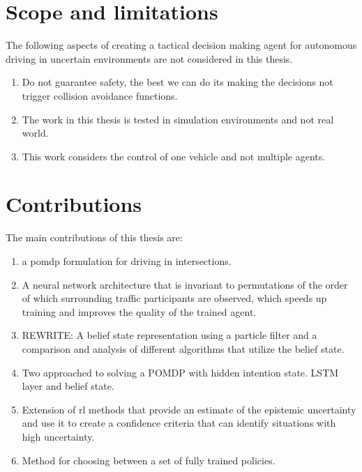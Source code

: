 \section{Scope and limitations}
\label{sec:scope}
The following aspects of creating a tactical decision making agent for autonomous driving in uncertain environments are not considered in this thesis. 

\begin{enumerate}
	\item Do not guarantee safety, the best we can do its making the decisions not trigger collision avoidance functions. 
	\item The work in this thesis is tested in simulation environments and not real world. 
	\item This work considers the control of one vehicle and not multiple agents. 
	
	
\end{enumerate}


\section{Contributions}
\label{sec:contributions}
The main contributions of this thesis are:
\begin{enumerate}
	\item a \gls{pomdp} formulation for driving in intersections. 
	\item A neural network architecture that is invariant to permutations of the order of which surrounding traffic participants are observed, which speeds up training and improves the quality of the trained agent. 
	\item REWRITE: A belief state representation using a particle filter and a comparison and analysis of different algorithms that utilize the belief state. 
	\item Two approached to solving a POMDP with hidden intention state. LSTM layer and belief state. 
	\item Extension of \gls{rl} methods that provide an estimate of the epistemic uncertainty and use it to create a confidence criteria that can identify situations with high uncertainty. 
	\item Method for choosing between a set of fully trained policies. 

\end{enumerate}


